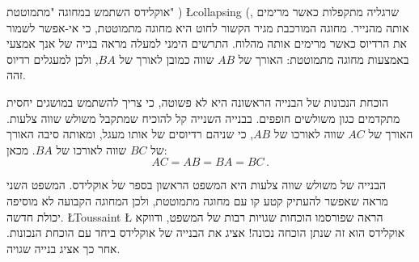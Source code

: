 אוקלידס השתמש במחוגה "מתמוטטת" )%
\L{collapsing}%
(,
שרגליה מתקפלות כאשר מרימים אותה מהנייר. מחוגה המורכבת מגיר הקשור לחוט היא מחוגה מתמוטטת, כי אי-אפשר לשמור את הרדיוס כאשר מרימים אותה מהלוח. התרשים הימני למעלה מראה בנייה של אנך אמצעי באמצעות מחוגה מתמוטטת: האורך של
$AB$
שווה כמובן לאורך של
$BA$,
ולכן למעגלים רדיוס זהה.

הוכחת הנכונות של הבנייה הראשונה היא לא פשוטה, כי צריך להשתמש במושגים יחסית מתקדמים כגון משולשים חופפים. בבנייה השנייה קל להוכיח שמתקבל משולש שווה צלעות. האורך של
$AC$
שווה לאורכו של
$AB$,
כי שניהם רדיוסים של אותו מעגל, ומאותה סיבה האורך של
$BC$
שווה לאורכו של
$BA$.
מכאן:
\[
AC = AB = BA = BC\,.
\]

\vspace{-2ex}

\begin{center}
\end{center}

\np

הבנייה של משולש שווה צלעות היא המשפט הראשון בספר של אוקלידס. המשפט השני מראה שאפשר להעתיק קטע קו עם מחוגה מתמוטטת, ולכן המחוגה הקבועה לא מוסיפה יכולת חדשה. 
\L{Toussaint} \L{\cite{toussaint}}
הראה שפורסמו הוכחות שגויות רבות של המשפט, ודווקא אוקלידס הוא זה שנתן הוכחה נכונה! אציג את הבנייה של אוקלידס ביחד עם הוכחת הנכונות. אחר כך אציג בנייה שגויה.

